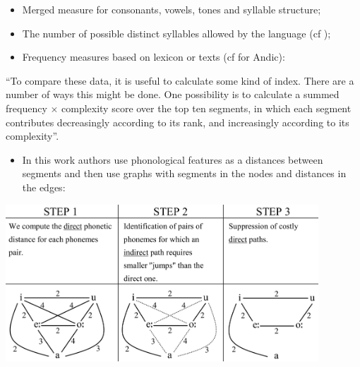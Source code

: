 \documentclass[
  ignorenonframetext,
]{beamer}
\providecommand{\tightlist}{%
  \setlength{\itemsep}{0pt}\setlength{\parskip}{0pt}}
\begin{document}
\begin{frame}{\citep{maddieson09}}
\protect\hypertarget{maddieson09-2}{}
\begin{itemize}
\tightlist
\item
  Merged measure for consonants, vowels, tones and syllable structure;
\item
  The number of possible distinct syllables allowed by the language (cf
  \citep{shosted06});
\item
  Frequency measures based on lexicon or texts (cf \citep{davidenko21}
  for Andic):
\end{itemize}

``To compare these data, it is useful to calculate some kind of index.
There are a number of ways this might be done. One possibility is to
calculate a summed frequency \(\times\) complexity score over the top
ten segments, in which each segment contributes decreasingly according
to its rank, and increasingly according to its complexity''.
\citep[97]{maddieson09}
\end{frame}

\begin{frame}{\citep{coupe09}}
\protect\hypertarget{coupe09}{}
\begin{itemize}
\tightlist
\item
  In this work authors use phonological features as a distances between
  segments and then use graphs with segments in the nodes and distances
  in the edges:
\end{itemize}

\begin{center}\includegraphics[width=4.61in]{images/coupe09} \end{center}
\end{frame}
\end{document}
